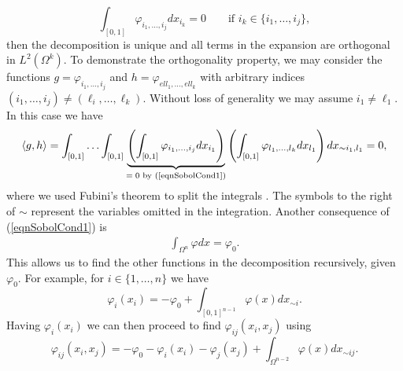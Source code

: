\documentclass{sfuthesis}
\begin{document}
\begin{equation}\label{eqnSobolCond1}
\int_{[0,1]}\varphi_{i_{1},\ldots,i_{j}}dx_{i_{k}}=0\qquad\text{if }  i_{k}\in \{i_{1},\ldots,i_{j}\},
\end{equation}
then the decomposition is unique and all terms in the expansion are orthogonal in $L^{2}(\Omega^{k})$. To 
demonstrate  the orthogonality property, 
we may  consider the functions $g=\varphi_{i_{1},\ldots,i_{j}}$ and $h=\varphi_{ell_{1},\ldots,ell_{k}}$ 
with arbitrary indices $(i_{1},\ldots,i_{j})\neq(\ell_{i},\ldots,\ell_{k})$. Without 
loss of generality we may  assume $i_{1}\neq \ell_{1}$. In this case we have
\begin{equation*}
\langle g,h\rangle=\int_{[0,1]}\ldots\int_{[0,1]}\underbrace{\left(\int_{[0,1]}\varphi_{i_{1},
\ldots,i_{j}}dx_{i_{1}}\right)}_{\text{$=0$ by (\ref{eqnSobolCond1})}}
\left(\int_{[0,1]}\varphi_{l_{1},\ldots,l_{k}}dx_{l_{1}}\right)dx_{\sim i_{1},l_{1}}=0,
\end{equation*}
where we used Fubini's theorem to split the integrals \cite{lerner2014course}. The symbols to the right of $\sim$ 
represent the variables omitted in the integration.
Another consequence of  (\ref{eqnSobolCond1}) is 
\begin{eqnarray*}
\int_{\Omega^{n}}\varphi dx=\varphi_{0}.
\end{eqnarray*}
This allows us to find  the other functions in the decomposition recursively,
given $\varphi_{0}$. For example, 
for $i\in \{1,\ldots,n\}$ we have
\begin{equation*}
\varphi_{i}(x_{i})=-\varphi_{0}+\int_{[0,1]^{n-1}}\varphi(x)dx_{\sim i}.
\end{equation*}
Having $\varphi_{i}(x_{i})$ we can then proceed to find $\varphi_{ij}(x_{i},x_{j})$ using
\begin{equation*}
\varphi_{ij}(x_{i},x_{j})=-\varphi_{0}-\varphi_{i}(x_{i})-\varphi_{j}(x_{j})+
\int_{\Omega^{n-2}}\varphi(x)dx_{\sim ij}.
\end{equation*}
\end{document}

